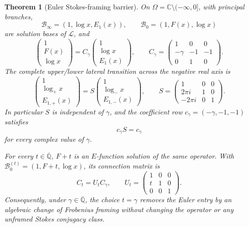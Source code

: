 \documentclass[11pt]{article}
\newtheorem{theorem}{Theorem}[section]
\theoremstyle{definition}
\theoremstyle{remark}
\newcommand{\Qbar}{\overline{\mathbb Q}}
\newcommand{\C}{\mathbb C}
\begin{document}
\begin{theorem}[Euler Stokes-framing barrier]
\label{thm:stokes-framing}
On \(\Omega=\C\setminus(-\infty,0]\), with principal branches,
\[
 \mathcal B_\infty=(1,\log x,E_1(x)),
 \qquad
 \mathcal B_0=(1,F(x),\log x)
\]
are solution bases of \(\mathcal L\), and
\begin{equation}\label{eq:C-gamma}
 \begin{pmatrix}1\\F(x)\\\log x\end{pmatrix}
 =C_\gamma
 \begin{pmatrix}1\\\log x\\E_1(x)\end{pmatrix},
 \qquad
 C_\gamma=
 \begin{pmatrix}
 1&0&0\\
 -\gamma&-1&-1\\
 0&1&0
 \end{pmatrix}.
\end{equation}
The complete upper/lower lateral transition across the negative real axis is
\begin{equation}\label{eq:stokes-transition}
 \begin{pmatrix}1\\\log_+x\\E_{1,+}(x)\end{pmatrix}
 =S
 \begin{pmatrix}1\\\log_-x\\E_{1,-}(x)\end{pmatrix},
 \qquad
 S=
 \begin{pmatrix}
 1&0&0\\
 2\pi i&1&0\\
 -2\pi i&0&1
 \end{pmatrix}.
\end{equation}
In particular \(S\) is independent of \(\gamma\), and the coefficient row
\(c_\gamma=(-\gamma,-1,-1)\) satisfies
\begin{equation}\label{eq:stokes-cocycle-blind}
 \boxed{c_\gamma S=c_\gamma}
\end{equation}
for every complex value of \(\gamma\).

For every \(t\in\Qbar\), \(F+t\) is an \(E\)-function solution of the same
operator.  With \(\mathcal B_0^{(t)}=(1,F+t,\log x)\), its connection
matrix is
\begin{equation}\label{eq:framing-shear}
 C_t=U_tC_\gamma,
 \qquad
 U_t=\begin{pmatrix}1&0&0\\t&1&0\\0&0&1\end{pmatrix}.
\end{equation}
Consequently, under \(\gamma\in\Qbar\), the choice \(t=\gamma\) removes
the Euler entry by an algebraic change of Frobenius framing without changing
the operator or any unframed Stokes conjugacy class.
\end{theorem}
\end{document}
